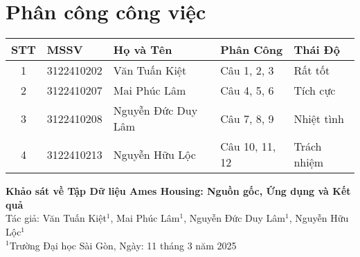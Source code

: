 \documentclass{article}
\begin{document}
\begin{titlepage}
\end{titlepage}

\newpage

\section*{Phân công công việc} %

\vspace{0.5cm} %

\begin{tabular}{|c|l|l|l|l|}
    \hline
    \textbf{STT} & \textbf{MSSV} & \textbf{Họ và Tên} & \textbf{Phân Công} & \textbf{Thái Độ} \\ \hline
    1 & 3122410202 & Văn Tuấn Kiệt & Câu 1, 2, 3 & Rất tốt \\ \hline
    2 & 3122410207 & Mai Phúc Lâm & Câu 4, 5, 6 & Tích cực \\ \hline
    3 & 3122410208 & Nguyễn Đức Duy Lâm & Câu 7, 8, 9 & Nhiệt tình \\ \hline
    4 & 3122410213 & Nguyễn Hữu Lộc & Câu 10, 11, 12 & Trách nhiệm \\ \hline
\end{tabular}

\vspace{0.5cm}

\newpage
\tableofcontents
\newpage

\begin{center}
    \textbf{\Large Khảo sát về Tập Dữ liệu Ames Housing: Nguồn gốc, Ứng dụng và Kết quả} \\
    \vspace{0.5cm}
    \normalsize Tác giả: Văn Tuấn Kiệt$^1$, Mai Phúc Lâm$^1$, Nguyễn Đức Duy Lâm$^1$, Nguyễn Hữu Lộc$^1$ \\
    \vspace{0.2cm}
    $^1$Trường Đại học Sài Gòn,
    \vspace{0.2cm}
    Ngày: 11 tháng 3 năm 2025 \\
    \vspace{0.2cm}
\end{center}
\end{document}
